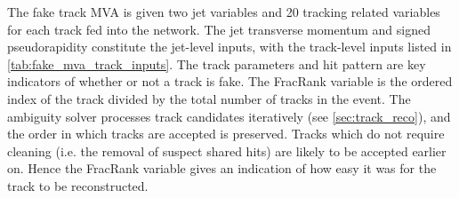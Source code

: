 
The fake track MVA is given two jet variables and 20 tracking related variables for each track fed into the network.
The jet transverse momentum and signed pseudorapidity constitute the jet-level inputs, with the track-level inputs listed in \cref{tab:fake_mva_track_inputs}.
The track parameters and hit pattern are key indicators of whether or not a track is fake.
The FracRank variable is the ordered index of the track divided by the total number of tracks in the event.
The ambiguity solver processes track candidates iteratively (see \cref{sec:track_reco}), and the order in which tracks are accepted is preserved.
Tracks which do not require cleaning (i.e. the removal of suspect shared hits) are likely to be accepted earlier on.
Hence the FracRank variable gives an indication of how easy it was for the track to be reconstructed.

